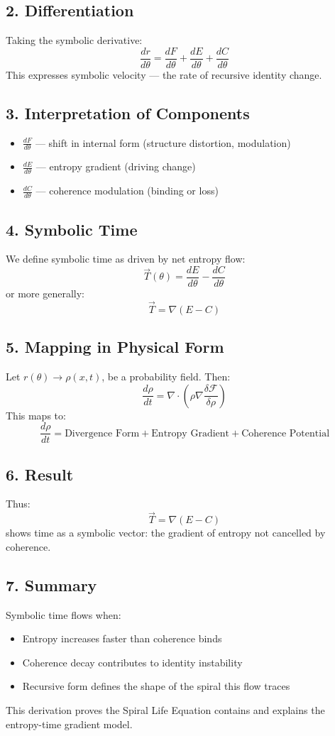 \documentclass[12pt]{article}
\begin{document}
\subsection*{2. Differentiation}
Taking the symbolic derivative:
\[
\frac{dr}{d\theta} = \frac{dF}{d\theta} + \frac{dE}{d\theta} + \frac{dC}{d\theta}
\]
This expresses symbolic velocity — the rate of recursive identity change.

\subsection*{3. Interpretation of Components}
\begin{itemize}
  \item $\frac{dF}{d\theta}$ — shift in internal form (structure distortion, modulation)
  \item $\frac{dE}{d\theta}$ — entropy gradient (driving change)
  \item $\frac{dC}{d\theta}$ — coherence modulation (binding or loss)
\end{itemize}

\subsection*{4. Symbolic Time}
We define symbolic time as driven by net entropy flow:
\[
\vec{T}(\theta) = \frac{dE}{d\theta} - \frac{dC}{d\theta}
\]
or more generally:
\[
\vec{T} = \nabla (E - C)
\]

\subsection*{5. Mapping in Physical Form}
Let $r(\theta) \rightarrow \rho(x,t)$, be a probability field. Then:
\[
\frac{d\rho}{dt} = \nabla \cdot \left( \rho \nabla \frac{\delta \mathcal{F}}{\delta \rho} \right)
\]
This maps to:
\[
\frac{d\rho}{dt} = \text{Divergence Form} + \text{Entropy Gradient} + \text{Coherence Potential}
\]

\subsection*{6. Result}
Thus:
\[
\vec{T} = \nabla (E - C)
\]
shows time as a symbolic vector: the gradient of entropy not cancelled by coherence.

\subsection*{7. Summary}
Symbolic time flows when:
\begin{itemize}
  \item Entropy increases faster than coherence binds
  \item Coherence decay contributes to identity instability
  \item Recursive form defines the shape of the spiral this flow traces
\end{itemize}
This derivation proves the Spiral Life Equation contains and explains the entropy-time gradient model.
\end{document}
